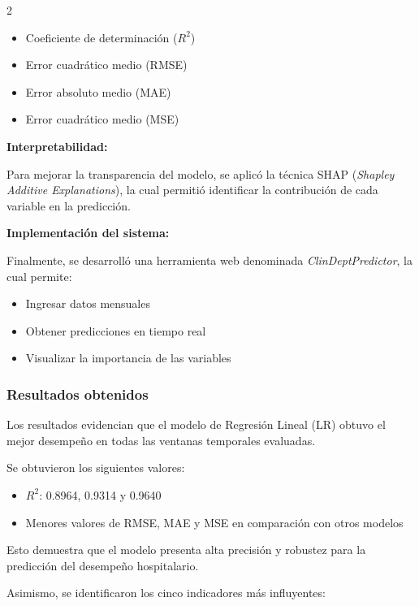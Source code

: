 \begin{multicols}{2}
\begin{itemize}
    \item Coeficiente de determinación ($R^2$)
    \item Error cuadrático medio (RMSE)
    \item Error absoluto medio (MAE)
    \item Error cuadrático medio (MSE)
\end{itemize}
\end{multicols}


\textbf{Interpretabilidad:}

Para mejorar la transparencia del modelo, se aplicó la técnica SHAP (\textit{Shapley Additive Explanations}), la cual permitió identificar la contribución de cada variable en la predicción.

\textbf{Implementación del sistema:}

Finalmente, se desarrolló una herramienta web denominada \textit{ClinDeptPredictor}, la cual permite:

\begin{itemize}
    \item Ingresar datos mensuales
    \item Obtener predicciones en tiempo real
    \item Visualizar la importancia de las variables
\end{itemize}

\subsubsection{Resultados obtenidos}

Los resultados evidencian que el modelo de Regresión Lineal (LR) obtuvo el mejor desempeño en todas las ventanas temporales evaluadas.

Se obtuvieron los siguientes valores:

\begin{itemize}
    \item $R^2$: 0.8964, 0.9314 y 0.9640
    \item Menores valores de RMSE, MAE y MSE en comparación con otros modelos
\end{itemize}

Esto demuestra que el modelo presenta alta precisión y robustez para la predicción del desempeño hospitalario.

Asimismo, se identificaron los cinco indicadores más influyentes:

